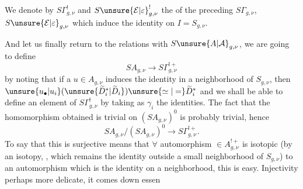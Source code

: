 
We denote by $S\Gamma^{!}_{g,\nu}$ and $S\unsure{\mathcal{E}|\varepsilon}^{!}_{g,\nu}$ the  of the preceding $S\Gamma_{g,\nu}$, $S\unsure{\mathcal{E}|\varepsilon}_{g,\nu}$ which induce the identity on $I=S_{g,\nu}$.

And let us finally return to the relations with $S\unsure{A|\mathcal A}_{g,\nu}$, we are going to define
\[
SA_{g,\nu}\longrightarrow S\Gamma^{!+}_{g,\nu}
\]
by  noting that if a $u\in A_{g,\nu}$ induces the identity in a neighborhood of $S_{g,\nu}$, then $\unsure{u_{\bullet}|u_i}(\unsure{\widetilde D_i^{*}|\widetilde D_i})\unsure{\simeq|=}\widetilde D_i^{*}$ and we shall be able to define an element of $S\Gamma^{!}_{g,\nu}$ by taking as $\gamma_i$ the identities. The fact that the homomorphism obtained is trivial on $(SA_{g,\nu})^0$ is probably trivial, hence
\[
SA_{g,\nu}/(SA_{g,\nu})^0\longrightarrow S\Gamma^{!+}_{g,\nu}.
\]
To say that this is surjective means that $\forall$ automorphism $\in A_{g,\nu}^{!+}$  is isotopic (by an isotopy, , which remains the identity outside a small neighborhood of $S_{g,\nu}$) to an automorphism which is the identity on a neighborhood, this is easy. Injectivity perhaps more delicate, it comes down essen



